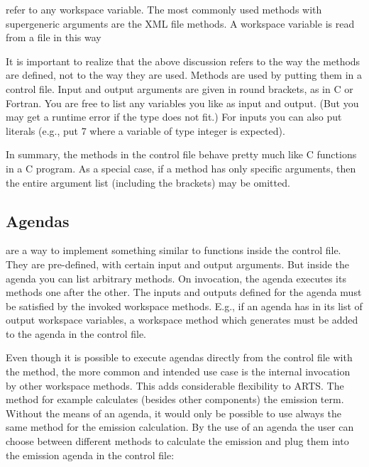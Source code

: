 \emph{} refer to any workspace
variable.  The most commonly used methods with supergeneric arguments
are the XML file methods. A workspace variable is read from a file in
this way
\begin{quote}
\end{quote}

It is important to realize that the above discussion refers to the way
the methods are defined, not to the way they are used. Methods are
used by putting them in a control file. Input and output arguments are
given in round brackets, as in C or Fortran. You are free to list any
variables you like as input and output. (But you may get a runtime
error if the type does not fit.) For inputs you can also put literals
(e.g., put 7 where a variable of type integer is expected). 

In summary, the methods in the control file behave pretty much like C
functions in a C program. As a special case, if a method has only
specific arguments, then the entire argument list (including the
brackets) may be omitted.


\subsection{Agendas}

 are a way to implement something similar to
functions inside the control file. They are pre-defined, with certain
input and output arguments. But inside the agenda you can list
arbitrary methods. On invocation, the agenda executes its methods one
after the other. The inputs and outputs defined for the agenda must be
satisfied by the invoked workspace methods. E.g., if an agenda has
 in its list of output workspace variables, a
workspace method which generates  must be added to
the agenda in the control file.

Even though it is possible to execute agendas directly from the
control file with the  method, the more
common and intended use case is the internal invocation by other
workspace methods. This adds considerable flexibility to ARTS. The
 method for example calculates (besides other
components) the emission term. Without the means of an agenda, it
would only be possible to use always the same method for the emission
calculation. By the use of an agenda the user can choose between
different methods to calculate the emission and plug them into the
emission agenda in the control file:

